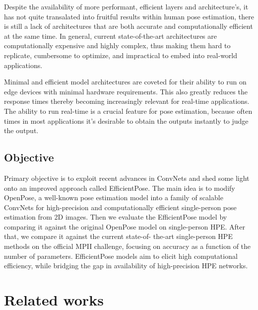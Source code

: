 \documentclass{fisatprojectfinal}
\begin{document}
Despite the availability of more performant, efficient layers and architecture's, it has not quite transalated
into fruitful results within human pose estimation, there is still a lack of architectures that
are both accurate and computationally efficient at the same
time. In general, current state-of-the-art architectures are
computationally expensive and highly complex, thus making them hard to replicate, cumbersome to optimize, and
impractical to embed into real-world applications. \par

Minimal and efficient model architectures are coveted for their ability to run on edge devices with minimal hardware requirements.
This also greatly reduces the response times thereby becoming increasingly relevant for real-time applications.
The ability to run real-time is a crucial feature for pose estimation, because often times in most applications it's desirable to obtain the outputs instantly to judge the output.

\section{Objective}

Primary objective is to exploit recent advances in ConvNets and shed some light onto
an improved approach called EfficientPose. The main idea
is to modify OpenPose, a well-known pose estimation model into a family of scalable ConvNets
for high-precision and computationally efficient single-person
pose estimation from 2D images. 
Then we evaluate the EfficientPose model by comparing
it against the original OpenPose model on single-person
HPE. After that, we compare it against the current state-of-
the-art single-person HPE methods on the official MPII
challenge, focusing on accuracy as a function of the number
of parameters. EfficientPose models aim to
elicit high computational efficiency, while bridging the gap
in availability of high-precision HPE networks.

\chapter{Related works}
\end{document}
